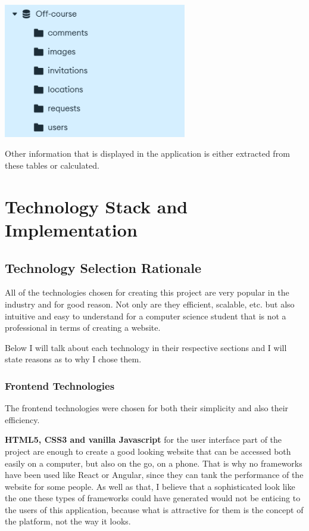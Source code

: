 \documentclass[12pt,a4paper]{report}
\begin{document}
\begin{center}
\includegraphics[width=0.6\textwidth]{images/database.png}
\end{center}

Other information that is displayed in the application is either extracted from these tables or calculated.

\chapter{Technology Stack and Implementation}
\section{Technology Selection Rationale}

All of the technologies chosen for creating this project are very popular in the industry and for good reason. Not only are they efficient, scalable, etc. but also intuitive and easy to understand for a computer science student that is not a professional in terms of creating a website.

Below I will talk about each technology in their respective sections and I will state reasons as to why I chose them.

\subsection{Frontend Technologies}
The frontend technologies were chosen for both their simplicity and also their efficiency. 

\textbf{HTML5, CSS3 and vanilla Javascript} for the user interface part of the project are enough to create a good looking website that can be accessed both easily on a computer, but also on the go, on a phone. That is why no frameworks have been used like React or Angular, since they can tank the performance of the website for some people. As well as that, I believe that a sophisticated look like the one these types of frameworks could have generated would not be enticing to the users of this application, because what is attractive for them is the concept of the platform, not the way it looks.
\end{document}
